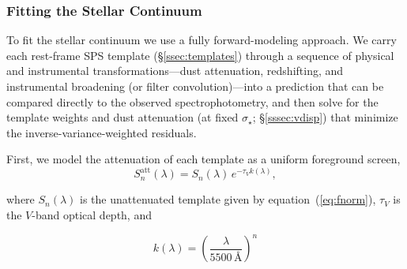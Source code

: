 \documentclass[modern,linenumbers]{aastex701}
\newcommand{\vdisp}{\ensuremath{\sigma_\star}}
\newcommand{\tauv}{\ensuremath{\tau_V}}
\begin{document}
%

\subsubsection{Fitting the Stellar Continuum}
\label{sssec:fitting}

To fit the stellar continuum we use a fully forward-modeling approach.
We carry each rest-frame SPS template (\S\ref{ssec:templates}) through
a sequence of physical and instrumental transformations---dust
attenuation, redshifting, and instrumental broadening (or filter
convolution)---into a prediction that can be compared directly to the
observed spectrophotometry, and then solve for the template weights
and dust attenuation (at fixed \vdisp; \S\ref{sssec:vdisp}) that
minimize the inverse-variance-weighted residuals.

First, we model the attenuation of each template as a
uniform foreground screen,
\begin{equation}
  S_n^\mathrm{att}(\lambda) = S_n(\lambda)\,e^{-\tauv k(\lambda)},
  \label{eq:atten}
\end{equation}

\noindent where $S_n(\lambda)$ is the unattenuated template given by
equation~(\ref{eq:fnorm}), $\tauv$ is the $V$-band optical depth, and

\begin{equation}
  k(\lambda) =
  \left(\frac{\lambda}{5500\,\text{\AA}}\right)^{n}
  \label{eq:kl}
\end{equation}
\end{document}
